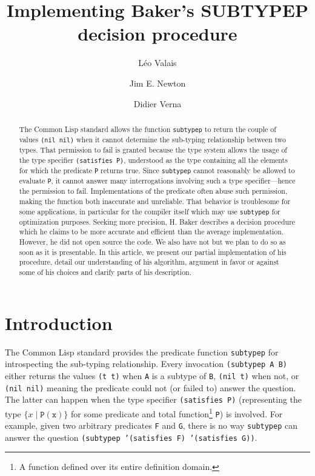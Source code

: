 \documentclass[format=sigconf]{acmart}
\title{Implementing Baker's SUBTYPEP decision procedure}
\author{Léo Valais}
\author{Jim E. Newton}
\author{Didier Verna}
\affiliation{%
  \institution{EPITA/LRDE}
  \streetaddress{14-16 rue Voltaire}
  \postcode{94270}
  \city{Le Kremlin-Bic{\^e}tre}
  \country{France}
}
\newcommand\code[2][\small]{\sloppy\texttt{#1#2}}
\theoremstyle{definition}
\begin{document}
\begin{abstract}
  The Common Lisp standard allows the function \code{subtypep} to return
  the couple of values \code{(nil nil)} when it cannot determine the
  sub-typing relationship between two types. That permission to fail
  is granted because the type system allows the usage of the type specifier
  \code{(satisfies P)}, understood as the type containing all the
  elements for which the predicate \code{P} returns true. Since \code{subtypep}
  cannot reasonably be allowed to evaluate \code{P}, it cannot answer many
  interrogations involving such a type specifier---hence the permission to fail.
  Implementations of the predicate often abuse such permission, making the
  function both inaccurate and unreliable. That behavior is troublesome for some
  applications, in particular for the compiler itself which may use
  \code{subtypep} for optimization purposes. Seeking more precision, H. Baker
  describes a decision procedure which he claims to be more accurate and
  efficient than the average implementation. However, he did not open source the
  code. We also have not but we plan to do so as soon as it is presentable.
  In this article, we present our partial implementation of his procedure, detail
  our understanding of his algorithm, argument in favor or against some of
  his choices and clarify parts of his description.
\end{abstract}

\maketitle

\section{Introduction}
The Common Lisp standard \cite{bib:ansi.94.cl} provides the predicate function
\code{subtypep} for
introspecting the sub-typing relationship. Every invocation \code{(subtypep A B)}
either returns the values \code{(t t)} when \code{A} is a subtype of \code{B},
\code{(nil t)} when not, or \code{(nil nil)} meaning the predicate could not
(or failed to) answer the question. The latter can happen when the type
specifier \code{(satisfies P)} (representing the type $\{x \mid
\mathtt{P(x)}\}$ for some predicate and total function\footnote{A function
  defined over its entire definition domain.} \code{P}) is involved. For example,
given two arbitrary predicates \code{F} and \code{G}, there is no way
\code{subtypep} can answer the question \code{(subtypep '(satisfies F)
  '(satisfies G))}.
\end{document}

